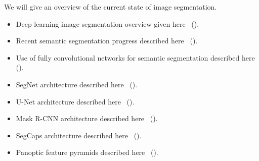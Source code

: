 We will give an overview of the current state of image segmentation.

\begin{itemize}
  \item Deep learning image segmentation overview given here~\cite{segmentation-overview} (\citeyear{segmentation-overview}).
  \item Recent semantic segmentation progress described here~\cite{segmentation-progress} (\citeyear{segmentation-progress}).
  \item Use of fully convolutional networks for semantic segmentation described here~\cite{segmentation-fcnn} (\citeyear{segmentation-fcnn}).
  \item SegNet architecture described here~\cite{segmentation-segnet} (\citeyear{segmentation-segnet}).
  \item U-Net architecture described here~\cite{segmentation-unet} (\citeyear{segmentation-unet}).
  \item Mask R-CNN architecture described here~\cite{segmentation-mask-r-cnn} (\citeyear{segmentation-mask-r-cnn}).
  \item SegCaps architecture described here~\cite{segmentation-segcaps} (\citeyear{segmentation-segcaps}).
  \item Panoptic feature pyramids described here~\cite{segmentation-panoptic-feature-pyramid} (\citeyear{segmentation-panoptic-feature-pyramid}).
\end{itemize}
